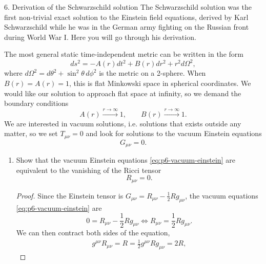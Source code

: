 \documentclass[11pt]{article}
\begin{document}
\begin{problem}{6. Derivation of the Schwarzschild solution}
	The Schwarzschild solution was the first non-trivial exact solution to the Einstein field equations, derived by Karl Schwarzschild while he was in the German army fighting on the Russian front during World War I.
	Here you will go through his derivation.

	The most general static time-independent metric can be written in the form
	\begin{equation}
		\label{eq:p6-static-metric}
		ds^2=-A(r)dt^2+B(r)dr^2+r^2d\Omega^2,
	\end{equation}
	where \(d\Omega^2=d\theta^2+\sin^2\theta\,d\phi^2\) is the metric on a 2-sphere.
	When \(B(r)=A(r)=1\), this is flat Minkowski space in spherical coordinates.
	We would like our solution to approach flat space at infinity, so we demand the boundary conditions
	\begin{equation}
		\label{eq:p6-boundary-conditions}
		A(r)\xrightarrow{r\to\infty}1,\qquad B(r)\xrightarrow{r\to\infty}1.
	\end{equation}
	We are interested in vacuum solutions, i.e. solutions that exists outside any matter, so we set \(T_{\mu\nu}=0\) and look for solutions to the vacuum Einstein equations
	\begin{equation}
		\label{eq:p6-vacuum-einstein}
		G_{\mu\nu}=0.
	\end{equation}
	\begin{enumerate}[label=(\alph*)]
		\item Show that the vacuum Einstein equations \cref{eq:p6-vacuum-einstein} are equivalent to the vanishing of the Ricci tensor
		      \begin{equation}
			      \label{eq:p6-vacuum-ricci}
			      R_{\mu\nu}=0.
		      \end{equation}
          \begin{proof}
            Since the Einstein tensor is \( G_{\mu\nu} = R_{\mu\nu} - \frac{1}{2}Rg_{\mu\nu} \), the vacuum equations \cref{eq:p6-vacuum-einstein} are
            \begin{equation}
            \label{eq:9}
              0 = R_{\mu\nu} - \frac{1}{2}Rg_{\mu\nu} \iff R_{\mu\nu} = \frac{1}{2}Rg_{\mu\nu}.
          \end{equation}
          We can then contract both sides of the equation,
          \begin{equation}
          \label{eq:10}
          \begin{aligned}
            g^{\mu\nu}R_{\mu\nu} = R = \frac{1}{2}g^{\mu\nu}Rg_{\mu\nu} = 2R,

\end{aligned}
\end{equation}
\end{proof}
\end{enumerate}
\end{problem}
\end{document}
